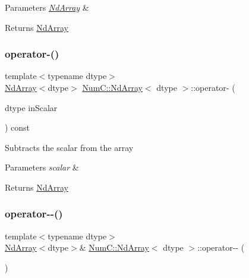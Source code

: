 \begin{DoxyParams}{Parameters}
{\em \mbox{\hyperlink{class_num_c_1_1_nd_array}{Nd\+Array}}} & \\
\hline
\end{DoxyParams}
\begin{DoxyReturn}{Returns}
\mbox{\hyperlink{class_num_c_1_1_nd_array}{Nd\+Array}} 
\end{DoxyReturn}
\mbox{\label{class_num_c_1_1_nd_array_a3a7f3f151033d72f08d1a0875e7f0c7f}} 
\subsubsection{\texorpdfstring{operator-\/()}{operator-()}\hspace{0.1cm}{\footnotesize\ttfamily [2/2]}}
{\footnotesize\ttfamily template$<$typename dtype$>$ \\
\mbox{\hyperlink{class_num_c_1_1_nd_array}{Nd\+Array}}$<$dtype$>$ \mbox{\hyperlink{class_num_c_1_1_nd_array}{Num\+C\+::\+Nd\+Array}}$<$ dtype $>$\+::operator-\/ (\begin{DoxyParamCaption}\item[{dtype}]{in\+Scalar }\end{DoxyParamCaption}) const\hspace{0.3cm}{\ttfamily [inline]}}

Subtracts the scalar from the array


\begin{DoxyParams}{Parameters}
{\em scalar} & \\
\hline
\end{DoxyParams}
\begin{DoxyReturn}{Returns}
\mbox{\hyperlink{class_num_c_1_1_nd_array}{Nd\+Array}} 
\end{DoxyReturn}
\mbox{\label{class_num_c_1_1_nd_array_a3570e7df7c2202a6a8a5f5770f132ba3}} 
\subsubsection{\texorpdfstring{operator-\/-\/()}{operator--()}\hspace{0.1cm}{\footnotesize\ttfamily [1/2]}}
{\footnotesize\ttfamily template$<$typename dtype$>$ \\
\mbox{\hyperlink{class_num_c_1_1_nd_array}{Nd\+Array}}$<$dtype$>$\& \mbox{\hyperlink{class_num_c_1_1_nd_array}{Num\+C\+::\+Nd\+Array}}$<$ dtype $>$\+::operator-\/-\/ (\begin{DoxyParamCaption}{ }\end{DoxyParamCaption})\hspace{0.3cm}{\ttfamily [inline]}}


